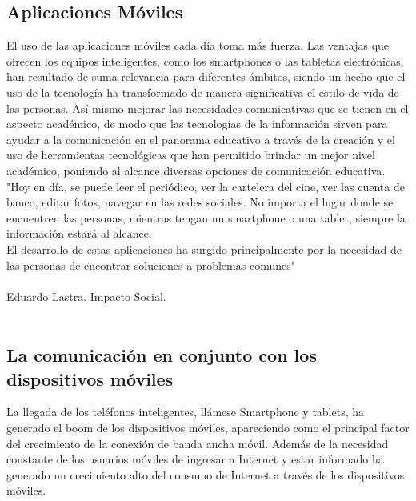 	\subsection{Aplicaciones Móviles}
	
	El uso de las aplicaciones móviles cada día toma más fuerza. Las ventajas que ofrecen los equipos inteligentes, como los smartphones o las tabletas electrónicas, han resultado de suma relevancia para diferentes ámbitos, siendo un hecho que el uso de la tecnología ha transformado de manera significativa el estilo de vida de las personas.
	Así mismo mejorar las necesidades comunicativas que se tienen en el aspecto académico, de modo que las tecnologías de la información sirven para ayudar a la comunicación en el panorama educativo a través de la creación y el uso de herramientas tecnológicas que han permitido brindar un mejor nivel académico, poniendo al alcance diversas opciones de comunicación educativa.\\
	
	"Hoy en día, se puede leer el periódico, ver la cartelera del cine, ver las cuenta de banco, editar fotos, navegar en las redes sociales. No importa el lugar donde se encuentren las personas, mientras tengan un smartphone o una tablet, siempre la información estará al alcance.\\
	El desarrollo de estas aplicaciones ha surgido principalmente por la necesidad de las personas de encontrar soluciones a problemas comunes"
	\\ \\
	Eduardo Lastra. Impacto Social.
	\\ \\
	
	\subsection{La comunicación en conjunto con los dispositivos móviles}
	La llegada de los teléfonos inteligentes, llámese Smartphone y tablets, ha generado el boom de los dispositivos móviles, apareciendo como el principal factor del crecimiento de la conexión de banda ancha móvil. Además de la necesidad constante de los usuarios móviles de ingresar a Internet y estar informado ha generado un crecimiento alto del consumo de Internet a través de los dispositivos móviles.
